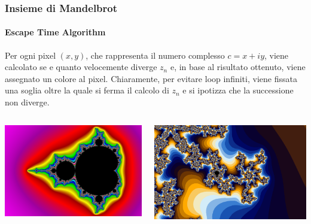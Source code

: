 \documentclass{beamer}
\begin{document}
			\begin{frame}
				\frametitle{Insieme di Mandelbrot}
				\framesubtitle{Escape Time Algorithm}
				Per ogni pixel $(x, y)$, che rappresenta il numero complesso $c = x + i y$, viene calcolato se e quanto velocemente diverge $z_n$ e, in base al risultato ottenuto, viene assegnato un colore al pixel.
				Chiaramente, per evitare loop infiniti, viene fissata una soglia oltre la quale si ferma il calcolo di $z_n$ e si ipotizza che la successione non diverge. 
				\begin{columns}
					\begin{column}{0.5\textwidth}
						\begin{center}
							\includegraphics[width=0.7\linewidth]{"../Insieme di Mandelbrot/mandelbrot_schifo"}
						\end{center}
					\end{column}
					\begin{column}{0.5\textwidth}
						\begin{center}
							\includegraphics[width=0.7\linewidth]{"../Insieme di Mandelbrot/Escape_Time_Algorithm_bands"}
						\end{center}
					\end{column}
				\end{columns}
			\end{frame}
\end{document}
